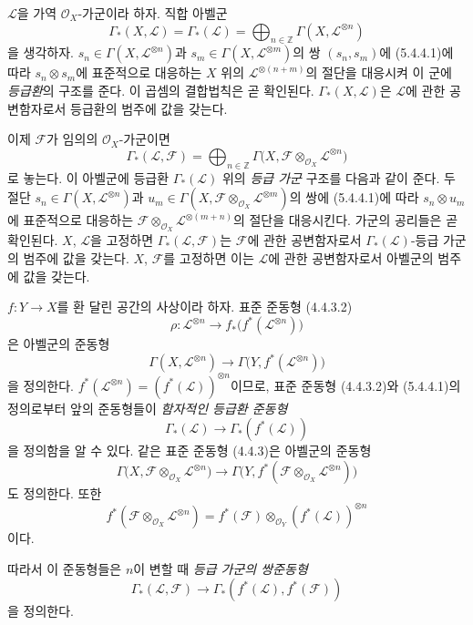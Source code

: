 \begin{env}[5.4.6]
\label{0.5.4.6-ko}
$\mathcal L$을 가역 $\mathcal O_X$-가군이라 하자. 직합 아벨군
\[
  \Gamma_*(X,\mathcal L)=\Gamma_*(\mathcal L)
  =\bigoplus_{n\in\mathbb Z}\Gamma(X,\mathcal L^{\otimes n})
\]
을 생각하자. $s_n\in\Gamma(X,\mathcal L^{\otimes n})$과
$s_m\in\Gamma(X,\mathcal L^{\otimes m})$의 쌍 $(s_n,s_m)$에
(5.4.4.1)에 따라 $s_n\otimes s_m$에 표준적으로 대응하는
$X$ 위의 $\mathcal L^{\otimes(n+m)}$의 절단을 대응시켜 이 군에
\emph{등급환}의 구조를 준다. 이 곱셈의 결합법칙은 곧 확인된다.
$\Gamma_*(X,\mathcal L)$은 $\mathcal L$에 관한 공변함자로서
등급환의 범주에 값을 갖는다.

이제 $\mathcal F$가 임의의 $\mathcal O_X$-가군이면
\[
  \Gamma_*(\mathcal L,\mathcal F)
  =\bigoplus_{n\in\mathbb Z}
   \Gamma\bigl(X,
     \mathcal F\otimes_{\mathcal O_X}\mathcal L^{\otimes n}\bigr)
\]
로 놓는다. 이 아벨군에 등급환 $\Gamma_*(\mathcal L)$ 위의
\emph{등급 가군} 구조를 다음과 같이 준다. 두 절단
$s_n\in\Gamma(X,\mathcal L^{\otimes n})$과
$u_m\in\Gamma(X,
\mathcal F\otimes_{\mathcal O_X}\mathcal L^{\otimes m})$의 쌍에
(5.4.4.1)에 따라 $s_n\otimes u_m$에 표준적으로 대응하는
$\mathcal F\otimes_{\mathcal O_X}\mathcal L^{\otimes(m+n)}$의 절단을
대응시킨다. 가군의 공리들은 곧 확인된다. $X$, $\mathcal L$을
고정하면 $\Gamma_*(\mathcal L,\mathcal F)$는 $\mathcal F$에 관한
공변함자로서 $\Gamma_*(\mathcal L)$-등급 가군의 범주에 값을 갖는다.
$X$, $\mathcal F$를 고정하면 이는 $\mathcal L$에 관한 공변함자로서
아벨군의 범주에 값을 갖는다.

$f:Y\to X$를 환 달린 공간의 사상이라 하자. 표준 준동형 (4.4.3.2)
\[
  \rho:\mathcal L^{\otimes n}
  \longrightarrow
  f_*\bigl(f^*(\mathcal L^{\otimes n})\bigr)
\]
은 아벨군의 준동형
\[
  \Gamma(X,\mathcal L^{\otimes n})
  \longrightarrow
  \Gamma\bigl(Y,f^*(\mathcal L^{\otimes n})\bigr)
\]
을 정의한다. $f^*(\mathcal L^{\otimes n})
=(f^*(\mathcal L))^{\otimes n}$이므로, 표준 준동형 (4.4.3.2)와
(5.4.4.1)의 정의로부터 앞의 준동형들이 \emph{함자적인 등급환
준동형}
\[
  \Gamma_*(\mathcal L)\longrightarrow
  \Gamma_*(f^*(\mathcal L))
\]
을 정의함을 알 수 있다. 같은 표준 준동형 (4.4.3)은 아벨군의
준동형
\[
  \Gamma\bigl(X,
    \mathcal F\otimes_{\mathcal O_X}\mathcal L^{\otimes n}\bigr)
  \longrightarrow
  \Gamma\bigl(Y,
    f^*(\mathcal F\otimes_{\mathcal O_X}\mathcal L^{\otimes n})\bigr)
\]
도 정의한다. 또한
\[
  f^*(\mathcal F\otimes_{\mathcal O_X}\mathcal L^{\otimes n})
  =f^*(\mathcal F)\otimes_{\mathcal O_Y}
   (f^*(\mathcal L))^{\otimes n}
  \tag{4.3.3.1}
\]
이다.


따라서 이 준동형들은 $n$이 변할 때 \emph{등급 가군의 쌍준동형}
\[
  \Gamma_*(\mathcal L,\mathcal F)
  \longrightarrow
  \Gamma_*(f^*(\mathcal L),f^*(\mathcal F))
\]
을 정의한다.
\end{env}

